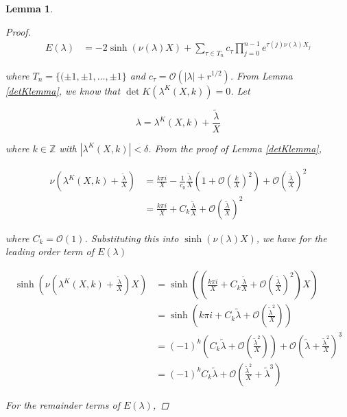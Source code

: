 \documentclass[12pt]{article}
\def\Z{{\mathbb Z}}
\newtheorem{lemma}{Lemma}
\begin{document}
\begin{lemma}
\begin{proof}
\begin{align*}
E(\lambda)
&= -2 \sinh(\nu(\lambda)X) + \sum_{\tau \in T_n}
c_\tau \prod_{j = 0}^{n-1} e^{\tau(j) \nu(\lambda)X_j}
\end{align*}

where $T_n = \{ (\pm 1, \pm 1, \dots, \pm 1 \}$ and $c_\tau = \mathcal{O}(|\lambda| + r^{1/2})$. From Lemma \ref{detKlemma}, we know that $\det K(\lambda^K(X,k)) = 0$. Let

\[
\lambda = \lambda^K(X,k) + \frac{\tilde{\lambda}}{X}
\]

where $k \in \Z$ with $|\lambda^K(X,k)|  < \delta$. From the proof of Lemma \ref{detKlemma}, 

\begin{align*}
\nu\left( \lambda^K(X, k) + \frac{\tilde{\lambda}}{X} \right) 
&= \frac{k \pi i}{X} -\frac{1}{c_0}\frac{\tilde{\lambda}}{X} \left( 1 + \mathcal{O} \left(\frac{k}{X}\right)^2 \right) + \mathcal{O}\left( \frac{\tilde{\lambda}}{X}\right)^2 \\
&= \frac{k \pi i}{X} + C_k \frac{\tilde{\lambda}}{X} + \mathcal{O}\left( \frac{\tilde{\lambda}}{X}\right)^2 
\end{align*}

where $C_k = \mathcal{O}(1)$. Substituting this into $\sinh(\nu(\lambda)X)$, we have for the leading order term of $E(\lambda)$

\begin{align*}
\sinh\left(\nu\left(\lambda^K(X, k) + \frac{\tilde{\lambda}}{X}\right)X\right)
&= \sinh\left(\left(\frac{k \pi i}{X} + C_k \frac{\tilde{\lambda}}{X} + \mathcal{O}\left( \frac{\tilde{\lambda}}{X}\right)^2 \right) X\right) \\
&= \sinh\left( k \pi i + C_k \tilde{\lambda} + \mathcal{O}\left( \frac{\tilde{\lambda}^2}{X}\right) \right) \\
&= (-1)^k \left( C_k \tilde{\lambda} + \mathcal{O}\left( \frac{\tilde{\lambda}^2}{X}\right) \right) + \mathcal{O}\left( \tilde{\lambda} + \frac{\tilde{\lambda}^2}{X} \right)^3 \\
&= (-1)^k C_k \tilde{\lambda} + \mathcal{O}\left( \frac{\tilde{\lambda}^2}{X} + \tilde{\lambda}^3 \right)
\end{align*}

For the remainder terms of $E(\lambda)$,


\end{proof}
\end{lemma}
\end{document}

